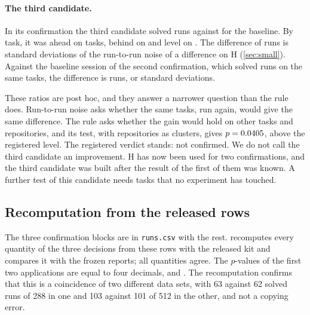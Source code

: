 \paragraph{The third candidate.}
In its confirmation the third candidate solved \ConfCandThree{} runs against \ConfBaseThree{} for the baseline. By
task, it was ahead on \CandThreeTasksUp{} tasks, behind on \CandThreeTasksDown{} and level on
\CandThreeTasksSame{}. The difference of \CandThreeDiffRuns{} runs is \CandThreeNoiseRatio{} standard deviations of
the run-to-run noise of a difference on H (\cref{sec:small}). Against the baseline session of the second
confirmation, which solved \RepeatHFirst{} runs on the same tasks, the difference is \CandThreeDiffEarlier{} runs, or
\CandThreeNoiseRatioEarlier{} standard deviations.

These ratios are post hoc, and they answer a narrower question than the rule does. Run-to-run noise asks whether the
same tasks, run again, would give the same difference. The rule asks whether the gain would hold on other tasks and
repositories, and its test, with repositories as clusters, gives $p = 0.0405$, above the registered level. The
registered verdict stands: not confirmed. We do not call the third candidate an improvement. H has now been used for
two confirmations, and the third candidate was built after the result of the first of them was known. A further test
of this candidate needs tasks that no experiment has touched.

\subsection{Recomputation from the released rows}

The three confirmation blocks are in \texttt{runs.csv} with the rest.  recomputes every
quantity of the three decisions from these rows with the released kit and compares it with the frozen reports;
all \RecheckQuantities{} quantities agree. The $p$-values of the first two applications are equal to four decimals,
\GatePOne{} and \GatePTwo{}. The recomputation confirms that this is a coincidence of two different data sets, with
63 against 62 solved runs of 288 in one and 103 against 101 of 512 in the other, and not a copying error.

